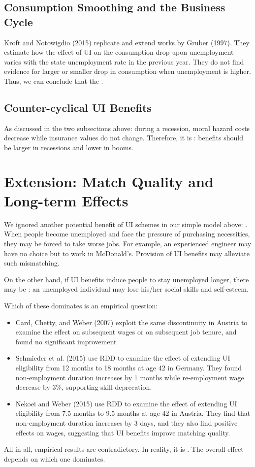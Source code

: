     \subsection{Consumption Smoothing and the Business Cycle}
    Kroft and Notowigdio (2015) replicate and extend works by Gruber (1997). They estimate how the effect of UI on the consumption drop upon unemployment varies with the state unemployment rate in the previous year. They do not find evidence for larger or smaller drop in consumption when unemployment is higher. Thus, we can conclude that the .
    
    \subsection{Counter-cyclical UI Benefits}
    As discussed in the two subsections above: during a recession, moral hazard costs decrease while insurance values do not change. Therefore, it is : benefits should be larger in recessions and lower in booms.
    
\section{Extension: Match Quality and Long-term Effects}
    We ignored another potential benefit of UI schemes in our simple model above: . When people become unemployed and face the pressure of purchasing necessities, they may be forced to take worse jobs. For example, an experienced engineer may have no choice but to work in McDonald's. Provision of UI benefits may alleviate such mismatching.
    
    On the other hand, if UI benefits induce people to stay unemployed longer, there may be : an unemployed individual may lose his/her social skills and self-esteem.
    
    Which of these dominates is an empirical question:
    \begin{itemize}
        \item Card, Chetty, and Weber (2007) exploit the same discontinuity in Austria to examine the effect on subsequent wages or on subsequent job tenure, and found no significant improvement
        \item Schmieder et al. (2015) use RDD to examine the effect of extending UI eligibility from 12 months to 18 months at age 42 in Germany. They found non-employment duration increases by 1 months while re-employment wage decrease by 3\%, supporting skill deprecation.
        \item Nekoei and Weber (2015) use RDD to examine the effect of extending UI eligibility from 7.5 months to 9.5 months at age 42 in Austria. They find that non-employment duration increases by 3 days, and they also find positive effects on wages, suggesting that UI benefits improve matching quality.
    \end{itemize}
    
    All in all, empirical results are contradictory. In reality, it is . The overall effect depends on which one dominates.